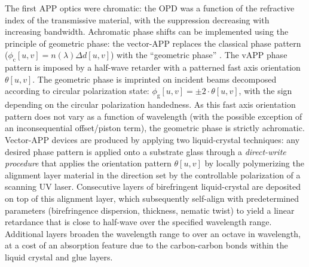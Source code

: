 \documentclass[letterpaper]{ar-1col}
\begin{document}



The first APP optics were chromatic: the OPD was a function of the refractive index of the transmissive material, with the suppression decreasing with increasing bandwidth.
%
Achromatic phase shifts can be implemented using the principle of geometric phase: the vector-APP \citep[vAPP; ][]{Snik12} replaces the classical phase pattern ($\phi_{\textrm{c}}[u,v] =
n(\lambda) \Delta d[u,v]$) with the ``geometric phase'' \citep[known as the Pancharatnam-Berry phase; ][]{Pancharatnam,Berry}.
%
The vAPP phase pattern is imposed by a half-wave retarder with a patterned fast axis orientation $\theta[u,v]$.
%
The geometric phase is imprinted on incident beams decomposed according to circular polarization state: $\phi_{\textrm{g}}[u,v] = \pm2\cdot\theta[u,v]$, with the sign depending on the circular polarization handedness.
As this fast axis orientation pattern does not vary as a function of wavelength (with the possible exception of an inconsequential offset/piston term), the geometric phase is strictly achromatic.
%
%
Vector-APP devices are produced by applying two liquid-crystal techniques: any desired phase pattern is applied onto a substrate glass through a \textit{direct-write procedure} \citep{directwrite} that applies the orientation pattern $\theta[u,v]$ by locally polymerizing the alignment layer material in the direction set by the controllable polarization of a scanning UV laser.
%
Consecutive layers of birefringent liquid-crystal are deposited on top of this alignment layer, which subsequently self-align \citep[``\textit{Multi-Twist Retarders}''; MTR ][]{MTR} with predetermined parameters (birefringence dispersion, thickness, nematic twist) to yield a linear retardance that is close to half-wave over the specified wavelength range.
%
Additional layers broaden the wavelength range to over an octave in wavelength, at a cost of an absorption feature due to the carbon-carbon bonds within the liquid crystal and glue layers.
\end{document}
